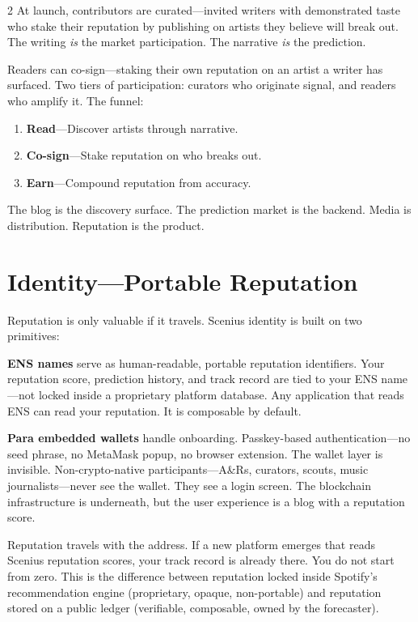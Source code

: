 \documentclass[9pt,oneside]{amsart}
\begin{document}
\begin{multicols}{2}
At launch, contributors are curated---invited writers with demonstrated taste who stake their reputation by publishing on artists they believe will break out. The writing \emph{is} the market participation. The narrative \emph{is} the prediction.

Readers can co-sign---staking their own reputation on an artist a writer has surfaced. Two tiers of participation: curators who originate signal, and readers who amplify it. The funnel:

\begin{enumerate}[nosep]
  \item \textbf{Read}---Discover artists through narrative.
  \item \textbf{Co-sign}---Stake reputation on who breaks out.
  \item \textbf{Earn}---Compound reputation from accuracy.
\end{enumerate}

The blog is the discovery surface. The prediction market is the backend. Media is distribution. Reputation is the product.

\section{Identity---Portable Reputation}

Reputation is only valuable if it travels. Scenius identity is built on two primitives:

\textbf{ENS names} serve as human-readable, portable reputation identifiers. Your reputation score, prediction history, and track record are tied to your ENS name---not locked inside a proprietary platform database. Any application that reads ENS can read your reputation. It is composable by default.

\textbf{Para embedded wallets} handle onboarding. Passkey-based authentication---no seed phrase, no MetaMask popup, no browser extension. The wallet layer is invisible. Non-crypto-native participants---A\&Rs, curators, scouts, music journalists---never see the wallet. They see a login screen. The blockchain infrastructure is underneath, but the user experience is a blog with a reputation score.

Reputation travels with the address. If a new platform emerges that reads Scenius reputation scores, your track record is already there. You do not start from zero. This is the difference between reputation locked inside Spotify's recommendation engine (proprietary, opaque, non-portable) and reputation stored on a public ledger (verifiable, composable, owned by the forecaster).


\end{multicols}
\end{document}
